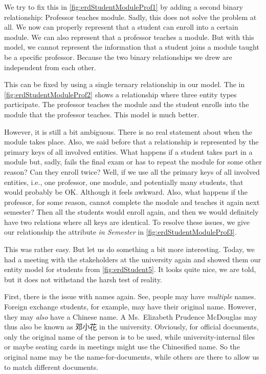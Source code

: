 We try to fix this in \cref{fig:erdStudentModuleProf1} by adding a second binary relationship:
Professor teaches module.
Sadly, this does not solve the problem at all.
We now can properly represent that a student can enroll into a certain module.
We can also represent that a professor teaches a module.
But with this model, we cannot represent the information that a student joins a module taught be a specific professor.
Because the two binary relationships we drew are independent from each other.

This can be fixed by using a single ternary relationship in our model.
The  in \cref{fig:erdStudentModuleProf2} shows a relationship where three entity types participate.
The professor teaches the module and the student enrolls into the module that the professor teaches.
This model is much better.

However, it is still a bit ambiguous.
There is no real statement about when the module takes place.
Also, we said before that a relationship is represented by the primary keys of all involved entities.
What happens if a student takes part in a module but, sadly, fails the final exam or has to repeat the module for some other reason?
Can they enroll twice?
Well, if we use all the primary keys of all involved entities, i.e., one professor, one module, and potentially many students, that would probably be OK.
Although it feels awkward.
Also, what happens if the professor, for some reason, cannot complete the module and teaches it again next semester?
Then all the students would enroll again, and then we would definitely have two relations where all keys are identical.
To resolve these issues, we give our relationship the attribute \emph{in Semester} in \cref{fig:erdStudentModuleProf3}.

This was rather easy.
But let us do something a bit more interesting.
Today, we had a meeting with the stakeholders at the university again and showed them our entity model for students from \cref{fig:erdStudent5}.
It looks quite nice, we are told, but it does not withstand the harsh test of reality.

First, there is the issue with names again.
See, people may have \emph{multiple} names.
Foreign exchange students, for example, may have their original name.
However, they may \emph{also} have a Chinese name.
A Ms.~Elizabeth Prudence McDouglas may thus also be known as 邓小花 in the university.
Obviously, for official documents, only the original name of the person is to be used, while university-internal files or maybe seating cards in meetings might use the Chinesified name.
So the original name may be the name-for-documents, while others are there to allow us to match different documents.

